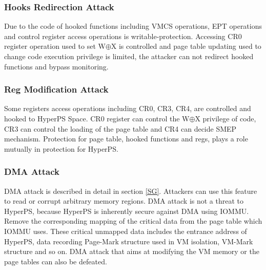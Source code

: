\subsubsection{Hooks Redirection Attack}

Due to the code of hooked functions including VMCS operations, EPT operations and control register access operations is writable-protection. Accessing CR0 register operation used to set W$\oplus${X} is controlled and page table updating used to change code execution privilege is limited, the attacker can not redirect hooked functions and bypass monitoring.

\subsubsection{Reg Modification Attack}

Some registers access operations including CR0, CR3, CR4, are controlled and hooked to HyperPS Space. CR0 register can control the W$\oplus${X} privilege of code, CR3 can control the loading of the page table and CR4 can decide SMEP mechanism. Protection for page table, hooked functions and regs, plays a role mutually in protection for HyperPS. 

\subsubsection{DMA Attack}

 DMA attack is described in detail in section \ref{SG}. Attackers can use this feature to read or corrupt arbitrary memory regions. DMA attack is not a threat to HyperPS, because HyperPS is inherently secure against DMA using IOMMU. Remove the corresponding mapping of the critical data from the page table which IOMMU uses. These critical unmapped data includes the entrance address of HyperPS, data recording Page-Mark structure used in VM isolation, VM-Mark structure and so on. DMA attack that aims at modifying the VM memory or the page tables can also be defeated.

